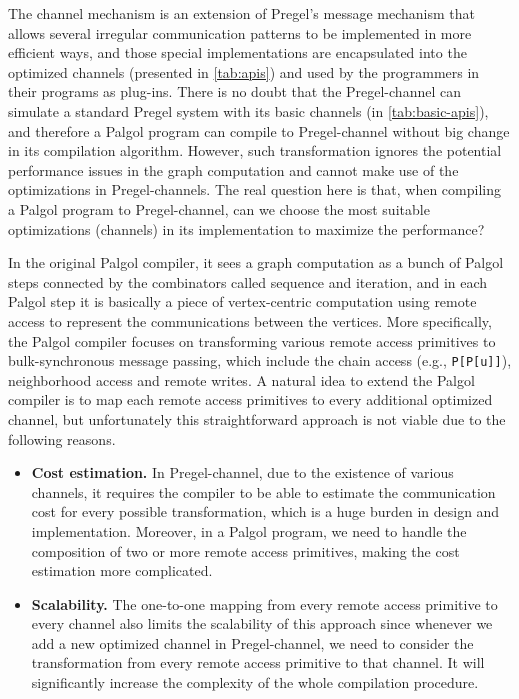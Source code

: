 \documentclass{sokendai_thesis} %
\begin{document}
The channel mechanism is an extension of Pregel's message mechanism that allows several irregular communication patterns to be implemented in more efficient ways, and those special implementations are encapsulated into the optimized channels (presented in \autoref{tab:apis}) and used by the programmers in their programs as plug-ins.
There is no doubt that the Pregel-channel can simulate a standard Pregel system with its basic channels (in \autoref{tab:basic-apis}), and therefore a Palgol program can compile to Pregel-channel without big change in its compilation algorithm.
However, such transformation ignores the potential performance issues in the graph computation and cannot make use of the optimizations in Pregel-channels.
The real question here is that, when compiling a Palgol program to Pregel-channel, can we choose the most suitable optimizations (channels) in its implementation to maximize the performance?


In the original Palgol compiler, it sees a graph computation as a bunch of Palgol steps connected by the combinators called sequence and iteration, and in each Palgol step it is basically a piece of vertex-centric computation using remote access to represent the communications between the vertices.
More specifically, the Palgol compiler focuses on transforming various remote access primitives to bulk-synchronous message passing, which include the chain access (e.g., \texttt{P[P[u]]}), neighborhood access and remote writes.
A natural idea to extend the Palgol compiler is to map each remote access primitives to every additional optimized channel, but unfortunately this straightforward approach is not viable due to the following reasons.
\begin{itemize}
  \item \textbf{Cost estimation.} In Pregel-channel, due to the existence of various channels, it requires the compiler to be able to estimate the communication cost for every possible transformation, which is a huge burden in design and implementation.
  Moreover, in a Palgol program, we need to handle the composition of two or more remote access primitives, making the cost estimation more complicated.
  \item \textbf{Scalability.} The one-to-one mapping from every remote access primitive to every channel also limits the scalability of this approach since whenever we add a new optimized channel in Pregel-channel, we need to consider the transformation from every remote access primitive to that channel.
  It will significantly increase the complexity of the whole compilation procedure.
\end{itemize}
\end{document}
